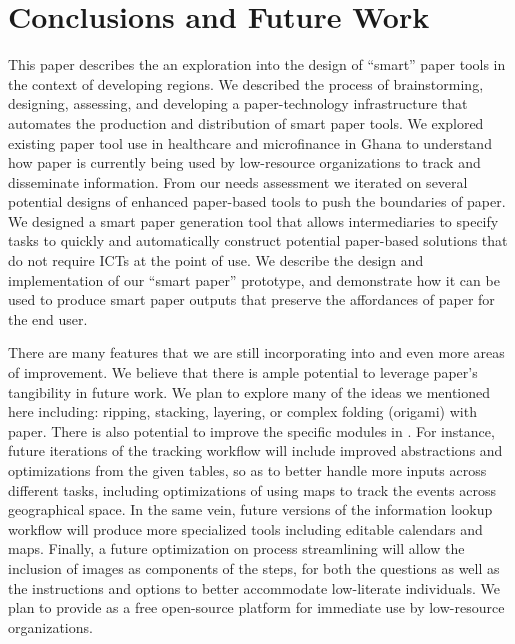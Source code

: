 \documentclass{sig-alternate}
\begin{document}



\section{Conclusions and Future Work}
\label{sec:future-work}

This paper describes the an exploration into the design of ``smart'' paper tools in the context of developing regions. We described the process of brainstorming, designing, assessing, and developing a paper-technology infrastructure that automates the production and distribution of smart paper tools. We explored existing paper tool use in healthcare and microfinance in Ghana to understand how paper is currently being used by low-resource organizations to track and disseminate information. From our needs assessment we iterated on several potential designs of enhanced paper-based tools to push the boundaries of paper. We designed a smart paper generation tool that allows intermediaries to specify tasks to quickly and automatically construct potential paper-based solutions that do not require ICTs at the point of use. We describe the design and implementation of our ``smart paper'' prototype, \nifty and demonstrate how it can be used to produce smart paper outputs that preserve the affordances of paper for the end user.

There are many features that we are still incorporating into \nifty and even more areas of improvement. We believe that there is ample potential to leverage paper's tangibility in future work. We plan to explore many of the ideas we mentioned here including: ripping, stacking, layering, or complex folding (origami) with paper. There is also potential to improve the specific modules in \nifty. For instance, future iterations of the tracking workflow will include improved abstractions and optimizations from the given tables, so as to better handle more inputs across different tasks, including optimizations of using maps to track the events across geographical space. In the same vein, future versions of the information lookup workflow will produce more specialized tools including editable calendars and maps. Finally, a future optimization on process streamlining will allow the inclusion of images as components of the steps, for both the questions as well as the instructions and options to better accommodate low-literate individuals. We plan to provide \nifty as a free open-source platform for immediate use by low-resource organizations.
\end{document}
